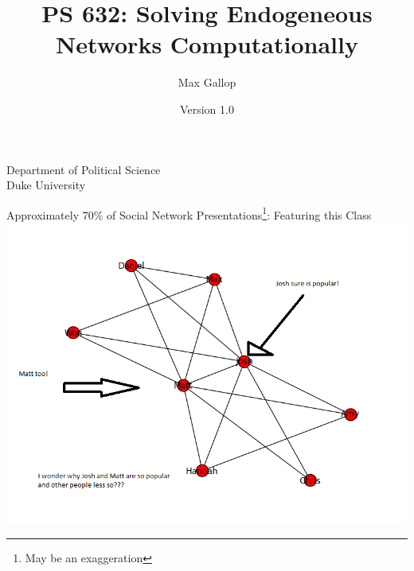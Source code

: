 \documentclass{beamer}
\begin{document}
\lstset{
basicstyle=\ttfamily,
keywordstyle=\bfseries,
showstringspaces=false,
columns = fullflexible,
mathescape = false,
language=R
}


\title[Gallop Network Formation]
{PS 632: Solving Endogeneous Networks Computationally}
\author[M. Gallop]
{Max Gallop} 
\institute
{		Department of Political Science\\
		Duke University\\
		
		}

\date{Version 1.0}

\begin{frame}
\titlepage
\end{frame}

\begin{frame}{Approximately 70\% of Social Network Presentations\footnote{May be an exaggeration}: Featuring this Class}
\includegraphics[scale = .5]{StupidExample.png}
\end{frame}


\end{document}

